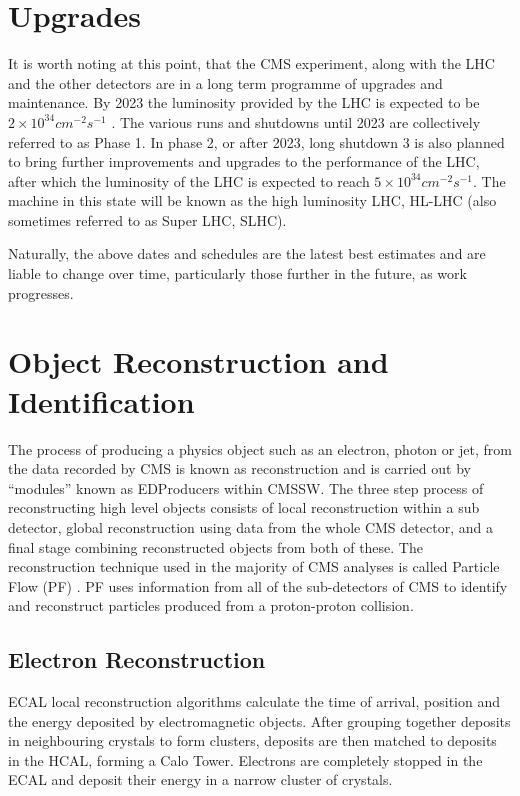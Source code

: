 \section{Upgrades}
\label{s:Upgrades}
It is worth noting at this point, that the CMS experiment, along with the LHC and the other detectors are in a
long term programme of upgrades and maintenance. By 2023 the luminosity provided by the LHC is expected to be
$2\times10^{34}cm^{-2}s^{-1}$ \cite{Technical_Proposal_Upgrade_of_CMS_Detector_through_2020}. The various runs
and shutdowns until 2023 are collectively referred to as Phase 1. In phase 2, or after 2023, long shutdown 3 is
also planned to bring further improvements and upgrades to the performance of the LHC, after which the
luminosity of the LHC is expected to reach $5\times10^{34}cm^{-2}s^{-1}$. The machine in this state will be
known as the high luminosity LHC, HL-LHC (also sometimes referred to as Super LHC, SLHC).

Naturally, the above dates and schedules are the latest best estimates and are liable to change over time,
particularly those further in the future, as work progresses.


\section{Object Reconstruction and Identification}
\label{s:object_reconstruction_and_identification}

The process of producing a physics object such as an electron, photon or jet, from the data recorded by CMS is
known as reconstruction and is carried out by ``modules'' known as EDProducers within CMSSW. The three
step process of reconstructing high level objects consists of local reconstruction within a sub detector,
global reconstruction using data from the whole CMS detector, and a final stage combining reconstructed
objects from both of these. The reconstruction technique used in the majority of CMS analyses is called
Particle Flow (PF) \cite{particle_flow}. PF uses information from all of the sub-detectors of CMS to identify
and reconstruct particles produced from a proton-proton collision. 

\subsection{Electron Reconstruction}
\label{ss:electron_reconstruction}
ECAL local reconstruction algorithms calculate the time of arrival, position and the energy deposited by
electromagnetic objects. After grouping together deposits in neighbouring crystals to form clusters, deposits
are then matched to deposits in the HCAL, forming a Calo Tower. Electrons are completely stopped in the ECAL
and deposit their energy in a narrow cluster of crystals.

